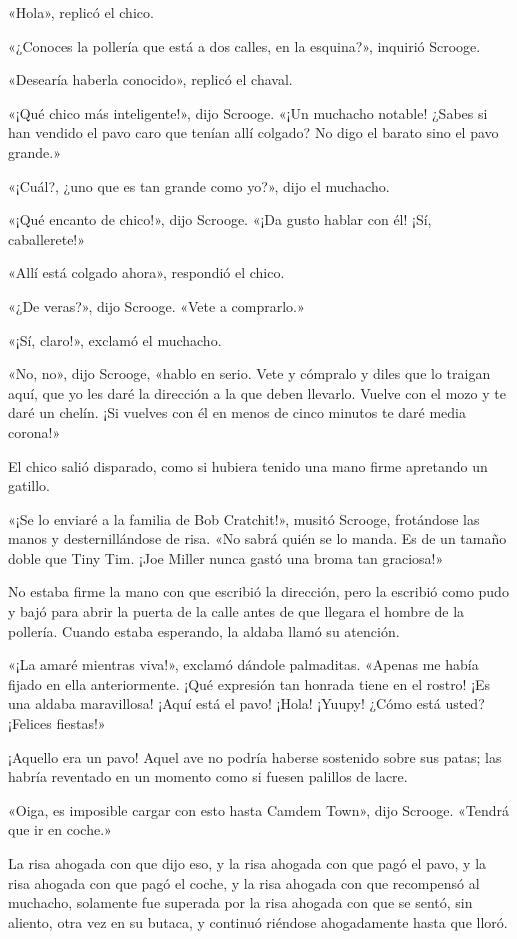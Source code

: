 \documentclass{novela}
\begin{document}
 «Hola», replicó el chico.

 «¿Conoces la pollería que está a dos calles, en la esquina?», inquirió Scrooge.

 «Desearía haberla conocido», replicó el chaval.

 «¡Qué chico más inteligente!», dijo Scrooge. «¡Un muchacho notable! ¿Sabes si han vendido el pavo caro que tenían allí colgado? No digo el barato sino el pavo grande.»

 «¡Cuál?, ¿uno que es tan grande como yo?», dijo el muchacho.

 «¡Qué encanto de chico!», dijo Scrooge. «¡Da gusto hablar con él! ¡Sí, caballerete!»

 «Allí está colgado ahora», respondió el chico.

 «¿De veras?», dijo Scrooge. «Vete a comprarlo.»

 «¡Sí, claro!», exclamó el muchacho.

 «No, no», dijo Scrooge, «hablo en serio. Vete y cómpralo y diles que lo traigan aquí, que yo les daré la dirección a la que deben llevarlo. Vuelve con el mozo y te daré un chelín. ¡Si vuelves con él en menos de cinco minutos te daré media corona!»

 El chico salió disparado, como si hubiera tenido una mano firme apretando un gatillo.

 «¡Se lo enviaré a la familia de Bob Cratchit!», musitó Scrooge, frotándose las manos y desternillándose de risa. «No sabrá quién se lo manda. Es de un tamaño doble que Tiny Tim. ¡Joe Miller nunca gastó una broma tan graciosa!»

 No estaba firme la mano con que escribió la dirección, pero la escribió como pudo y bajó para abrir la puerta de la calle antes de que llegara el hombre de la pollería. Cuando estaba esperando, la aldaba llamó su atención.

 «¡La amaré mientras viva!», exclamó dándole palmaditas. «Apenas me había fijado en ella anteriormente. ¡Qué expresión tan honrada tiene en el rostro! ¡Es una aldaba maravillosa! ¡Aquí está el pavo! ¡Hola! ¡Yuupy! ¿Cómo está usted? ¡Felices fiestas!»

 ¡Aquello era un pavo! Aquel ave no podría haberse sostenido sobre sus patas; las habría reventado en un momento como si fuesen palillos de lacre.

 «Oiga, es imposible cargar con esto hasta Camdem Town», dijo Scrooge. «Tendrá que ir en coche.»

 La risa ahogada con que dijo eso, y la risa ahogada con que pagó el pavo, y la risa ahogada con que pagó el coche, y la risa ahogada con que recompensó al muchacho, solamente fue superada por la risa ahogada con que se sentó, sin aliento, otra vez en su butaca, y continuó riéndose ahogadamente hasta que lloró.
\end{document}
